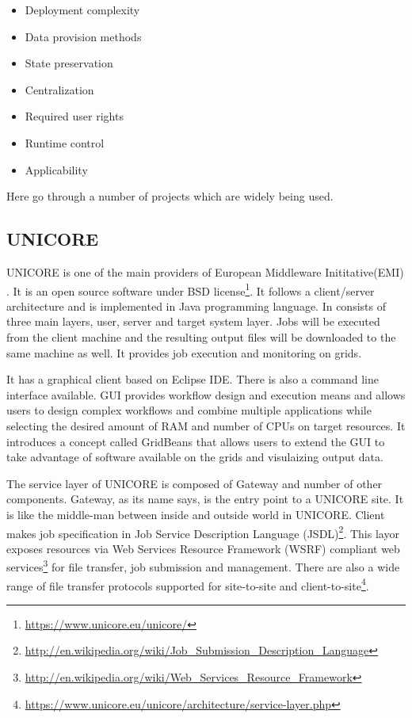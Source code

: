 \begin{itemize}
\item Deployment complexity
\item Data provision methods
\item State preservation
\item Centralization
\item Required user rights
\item Runtime control
\item Applicability
\end{itemize}
Here go through a number of projects which are widely being used.
\subsection{UNICORE}
UNICORE is one of the main providers of European Middleware Inititative(EMI) \cite{EMI}. 
It is an open source software under BSD license\footnote{\url{https://www.unicore.eu/unicore/}}.
It follows a client/server architecture and is implemented in Java programming
language.
In consists of three main layers, user, server and target system layer. 
Jobs will be executed from the client machine and the resulting output files will be downloaded
to the same machine as well. It provides job execution and monitoring on grids.\cite{unicore_wp}

It has a graphical client based on Eclipse IDE. There
is also a command line interface available. GUI provides workflow design and execution means and 
allows users to design complex workflows and combine multiple applications while selecting
the desired amount of RAM and number of CPUs on target resources. It introduces a concept 
called GridBeans that allows users to extend the GUI to take advantage of software available on
the grids and visulaizing output data.

The service layer of UNICORE is composed of Gateway and number of other components. Gateway, as
its name says, is the entry point to a UNICORE site. It is like the middle-man between inside
and outside world in UNICORE. Client makes job specification in Job Service Description Language
 (JSDL)\footnote{\url{http://en.wikipedia.org/wiki/Job_Submission_Description_Language}}.
 This layor exposes resources via Web Services Resource Framework (WSRF) compliant web 
 services\footnote{\url{http://en.wikipedia.org/wiki/Web_Services_Resource_Framework}}
 for file transfer, job submission and management. There are also a wide range of file transfer
 protocols supported for site-to-site and 
 client-to-site\footnote{\url{https://www.unicore.eu/unicore/architecture/service-layer.php}}.

